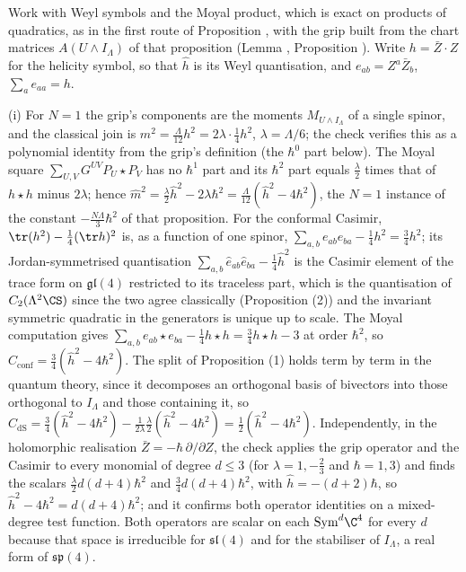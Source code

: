 Work with Weyl symbols and the Moyal product, which is exact on products of quadratics, as in the first route of Proposition , with the grip built from the chart matrices $A(U \wedge I_{\Lambda})$ of that proposition (Lemma , Proposition ). Write $h = \bar{Z}\cdot Z$ for the helicity symbol, so that $\hat{h}$ is its Weyl quantisation, and $e_{ab} = Z^{a}\bar{Z}_{b}$, $\sum_{a} e_{aa} = h$.

(i) For $N = 1$ the grip's components are the moments $M_{U \wedge I_{\Lambda}}$ of a single spinor, and the classical join is $m^{2} = \tfrac{\Lambda}{12}h^{2} = 2\lambda \cdot \tfrac14 h^{2}$, $\lambda = \Lambda/6$; the check verifies this as a polynomial identity from the grip's definition (the $\hbar^{0}$ part below). The Moyal square $\sum_{U,V}G^{UV}P_{U} \star P_{V}$ has no $\hbar^{1}$ part and its $\hbar^{2}$ part equals $\tfrac{\lambda}{2}$ times that of $h \star h$ minus $2\lambda$; hence $\hat{m}^{2} = \tfrac{\lambda}{2}\hat{h}^{2} - 2\lambda\hbar^{2} = \tfrac{\Lambda}{12}(\hat{h}^{2} - 4\hbar^{2})$, the $N = 1$ instance of the constant $-\tfrac{N\Lambda}{3}\hbar^{2}$ of that proposition. For the conformal Casimir, $\tr(h^{2}) - \tfrac14(\tr h)^{2}$ is, as a function of one spinor, $\sum_{a,b}e_{ab}e_{ba} - \tfrac14 h^{2} = \tfrac34 h^{2}$; its Jordan-symmetrised quantisation $\sum_{a,b}\hat{e}_{ab}\hat{e}_{ba} - \tfrac14\hat{h}^{2}$ is the Casimir element of the trace form on $\mathfrak{gl}(4)$ restricted to its traceless part, which is the quantisation of $C_{2}(\Lambda^{2}\CS)$ since the two agree classically (Proposition (2)) and the invariant symmetric quadratic in the generators is unique up to scale. The Moyal computation gives $\sum_{a,b}e_{ab} \star e_{ba} - \tfrac14 h \star h = \tfrac34 h \star h - 3$ at order $\hbar^{2}$, so $\hat{C}_{\mathrm{conf}} = \tfrac34(\hat{h}^{2} - 4\hbar^{2})$. The split of Proposition (1) holds term by term in the quantum theory, since it decomposes an orthogonal basis of bivectors into those orthogonal to $I_{\Lambda}$ and those containing it, so $\hat{C}_{\mathrm{dS}} = \tfrac34(\hat{h}^{2} - 4\hbar^{2}) - \tfrac{1}{2\lambda}\tfrac{\lambda}{2}(\hat{h}^{2} - 4\hbar^{2}) = \tfrac12(\hat{h}^{2} - 4\hbar^{2})$. Independently, in the holomorphic realisation $\bar{Z} = -\hbar\,\partial/\partial Z$, the check applies the grip operator and the Casimir to every monomial of degree $d \le 3$ (for $\lambda = 1, -\tfrac23$ and $\hbar = 1, 3$) and finds the scalars $\tfrac{\lambda}{2}d(d+4)\hbar^{2}$ and $\tfrac34 d(d+4)\hbar^{2}$, with $\hat{h} = -(d+2)\hbar$, so $\hat{h}^{2} - 4\hbar^{2} = d(d+4)\hbar^{2}$; and it confirms both operator identities on a mixed-degree test function. Both operators are scalar on each $\mathrm{Sym}^{d}\C^{4}$ for every $d$ because that space is irreducible for $\mathfrak{sl}(4)$ and for the stabiliser of $I_{\Lambda}$, a real form of $\mathfrak{sp}(4)$.

